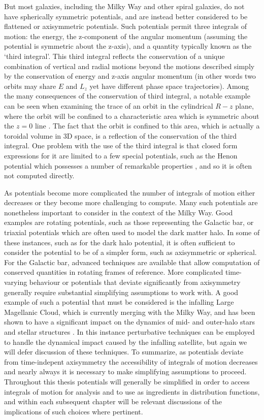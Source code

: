 But most galaxies, including the Milky Way and other spiral galaxies, do not have spherically symmetric potentials, and are instead better considered to be flattened or axisymmetric potentials. Such potentials permit three integrals of motion: the energy, the z-component of the angular momentum (assuming the potential is symmetric about the z-axis), and a quantity typically known as the `third integral'. This third integral reflects the conservation of a unique combination of vertical and radial motions beyond the motions described simply by the conservation of energy and z-axis angular momentum (in other words two orbits may share $E$ and $L_{z}$ yet have different phase space trajectories). Among the many consequences of the conservation of third integral, a notable example can be seen when examining the trace of an orbit in the cylindrical $R-z$ plane, where the orbit will be confined to a characteristic area which is symmetric about the $z=0$ line \parencite[see figure 3.4 in][]{binney08}. The fact that the orbit is confined to this area, which is actually a toroidal volume in 3D space, is a reflection of the conservation of the third integral. One problem with the use of the third integral is that closed form expressions for it are limited to a few special potentials, such as the Henon potential which possesses a number of remarkable properties \parencite{henon59a,binney14e}, and so it is often not computed directly.

As potentials become more complicated the number of integrals of motion either decreases or they become more challenging to compute. Many such potentials are nonetheless important to consider in the context of the Milky Way. Good examples are rotating potentials, such as those representing the Galactic bar, or triaxial potentials which are often used to model the dark matter halo. In some of these instances, such as for the dark halo potential, it is often sufficient to consider the potential to be of a simpler form, such as axisymmetric or spherical. For the Galactic bar, advanced techniques are available that allow computation of conserved quantities in rotating frames of reference. More complicated time-varying behaviour or potentials that deviate significantly from axisymmetry generally require substantial simplifying assumptions to work with. A good example of such a potential that must be considered is the infalling Large Magellanic Cloud, which is currently merging with the Milky Way, and has been shown to have a significant impact on the dynamics of mid- and outer-halo stars and stellar structures \parencite[e.g.][]{erkal19}. In this instance perturbative techniques can be employed to handle the dynamical impact caused by the infalling satellite, but again we will defer discussion of these techniques. To summarize, as potentials deviate from time-indepent axisymmetry the accessibility of integrals of motion decreases and nearly always it is necessary to make simplifying assumptions to proceed. Throughout this thesis potentials will generally be simplified in order to access integrals of motion for analysis and to use as ingredients in distribution functions, and within each subsequent chapter will be relevant discussions of the implications of such choices where pertinent.

